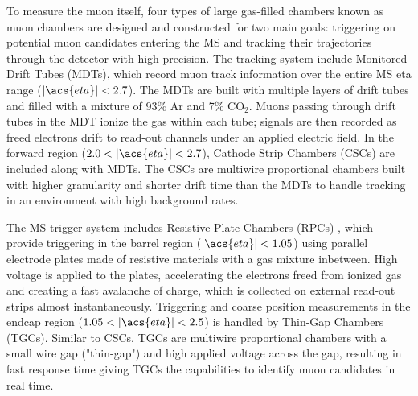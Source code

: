 \documentclass[../thesis.tex]{subfiles}
\begin{document}
To measure the muon itself, four types of large gas-filled chambers known as muon chambers \citep{atlas} are designed and constructed for two main goals: triggering on potential muon candidates entering the \acs{MS} and tracking their trajectories through the detector with high precision. The tracking system include Monitored Drift Tubes (\acs{MDT}s), which record muon track information over the entire \acs{MS} \acs{eta} range ($|\acs{eta}|<2.7$). The \acs{MDT}s are built with multiple layers of drift tubes and filled with a mixture of 93\% Ar and 7\% $\text{CO}_2$.  Muons passing through drift tubes in the \acs{MDT} ionize the gas within each tube; signals are then recorded as freed electrons drift to read-out channels under an applied electric field. In the forward region ($2.0<|\acs{eta}|<2.7$), Cathode Strip Chambers (\acs{CSC}s) are included along with \acs{MDT}s. The \acs{CSC}s are multiwire proportional chambers built with higher granularity and shorter drift time than the \acs{MDT}s to handle tracking in an environment with high background rates.

The \acs{MS} trigger system includes Resistive Plate Chambers (\acs{RPC}s) \citep{atlas}, which provide triggering in the barrel region ($|\acs{eta}|<1.05$) using parallel electrode plates made of resistive materials with a gas mixture inbetween. High voltage is applied to the plates, accelerating the electrons freed from ionized gas and creating a fast avalanche of charge, which is collected on external read-out strips almost instantaneously. Triggering and coarse position measurements in the endcap region ($1.05<|\acs{eta}|<2.5$) is handled by Thin-Gap Chambers (\acs{TGC}s). Similar to \acs{CSC}s, \acs{TGC}s are multiwire proportional chambers with a small wire gap ("thin-gap") and high applied voltage across the gap, resulting in fast response time giving \acs{TGC}s the capabilities to identify muon candidates in real time.
	
\end{document}
